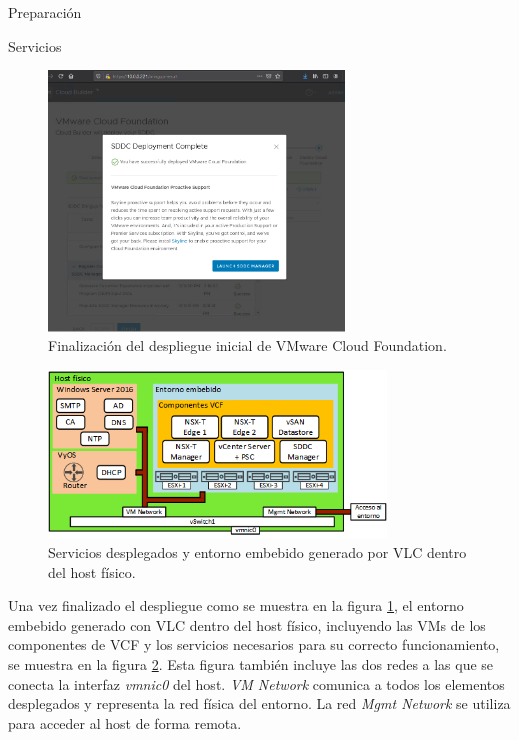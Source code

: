 \begin{subsection}{Preparación}
\begin{subsubsection}{Servicios}
  \end{subsubsection}
  \begin{figure}[h!]
    \centering
    \includegraphics[width=0.7\textwidth]{imaxes/pruebaconcepto/fin-despliegue.png}
    \caption{Finalización del despliegue inicial de VMware Cloud Foundation.}
    \label{fig:fin-despliegue}
  \end{figure}
  \FloatBarrier
    \begin{figure}[h!]
      \centering
      \includegraphics[width=0.8\textwidth]{imaxes/pruebaconcepto/hostFisico.png}
      \caption{Servicios desplegados y entorno embebido generado por VLC dentro del host físico.}
      \label{fig:estructura-generada-por-VLC}
    \end{figure}
    \FloatBarrier
    Una vez finalizado el despliegue como se muestra en la figura \ref{fig:fin-despliegue}, el entorno embebido generado con VLC dentro del host físico, incluyendo las VMs de los componentes de VCF y los servicios necesarios para su correcto funcionamiento, se muestra en la figura \ref{fig:estructura-generada-por-VLC}. Esta figura también incluye las dos redes a las que se conecta la interfaz \textit{vmnic0} del host. \textit{VM Network} comunica a todos los elementos desplegados y representa la red física del entorno. La red \textit{Mgmt Network} se utiliza para acceder al host de forma remota.


\end{subsection}
